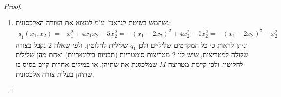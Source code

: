 \documentclass{article}
\begin{document}
    \begin{proof}
        \begin{enumerate}
            \item נשתמש בשיטת לגראנז' ע"מ למצוא את הצורה האלכסונית:
            \begin{align*}
                q_1(x_1, x_2)
                = -x_1^2 + 4x_1x_2 - 5x_2^2
                = - (x_1 - 2x_2)^2 + 4x_2^2 - 5x_2^2
                = \boxed{- (x_1 - 2x_2)^2 - x_2^2}
            \end{align*}
            וניתן לראות כי כל המקדמים שליליים ולכן $q_1$ שלילית לחלוטין.
            ולפי שאלה 2 נקבל בצורה שקולה למטריצות, שיש לנו 2 מטריצות סימטריות (תבניות בילינאריות) ואחת מהן שלילית לחלוטין.
            ולכן קיימת מטריצה $M$ שמלכסנת את שתיהן,
            או במילים אחרות קיים בסיס בו שתיהן בעלות צורה אלכסונית.


\end{enumerate}
\end{proof}
\end{document}
